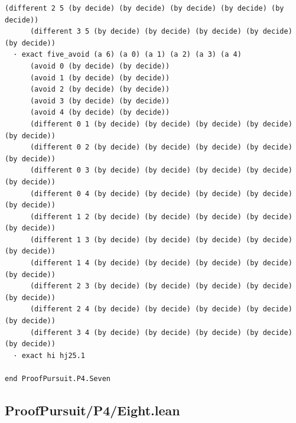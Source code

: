 \documentclass[11pt,a4paper]{article}
\begin{document}
\begin{Verbatim}[breaklines,breakanywhere,fontsize=\footnotesize]
      (different 2 5 (by decide) (by decide) (by decide) (by decide) (by decide))
      (different 3 5 (by decide) (by decide) (by decide) (by decide) (by decide))
  · exact five_avoid (a 6) (a 0) (a 1) (a 2) (a 3) (a 4)
      (avoid 0 (by decide) (by decide))
      (avoid 1 (by decide) (by decide))
      (avoid 2 (by decide) (by decide))
      (avoid 3 (by decide) (by decide))
      (avoid 4 (by decide) (by decide))
      (different 0 1 (by decide) (by decide) (by decide) (by decide) (by decide))
      (different 0 2 (by decide) (by decide) (by decide) (by decide) (by decide))
      (different 0 3 (by decide) (by decide) (by decide) (by decide) (by decide))
      (different 0 4 (by decide) (by decide) (by decide) (by decide) (by decide))
      (different 1 2 (by decide) (by decide) (by decide) (by decide) (by decide))
      (different 1 3 (by decide) (by decide) (by decide) (by decide) (by decide))
      (different 1 4 (by decide) (by decide) (by decide) (by decide) (by decide))
      (different 2 3 (by decide) (by decide) (by decide) (by decide) (by decide))
      (different 2 4 (by decide) (by decide) (by decide) (by decide) (by decide))
      (different 3 4 (by decide) (by decide) (by decide) (by decide) (by decide))
  · exact hi hj25.1

end ProofPursuit.P4.Seven
\end{Verbatim}

\subsection{ProofPursuit/P4/Eight.lean}\label{proofpursuitp4eight.lean}
\end{document}
